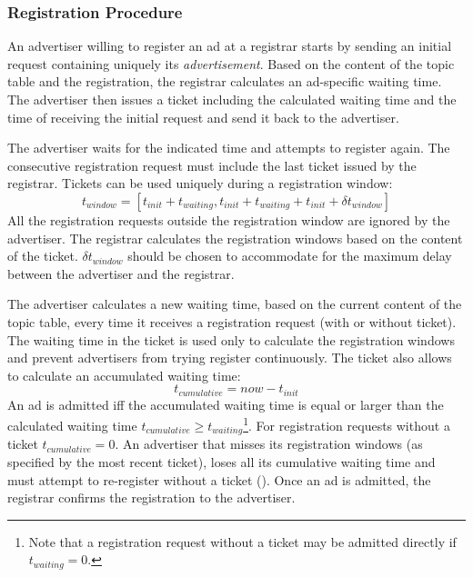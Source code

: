 \subsubsection{Registration Procedure}
An advertiser willing to register an ad at a registrar starts by sending an initial request containing uniquely its \emph{advertisement}. Based on the content of the topic table and the registration, the registrar calculates an ad-specific waiting time. The advertiser then issues a ticket including the calculated waiting time and the time of receiving the initial request and send it back to the advertiser. 

The advertiser waits for the indicated time and attempts to register again. The consecutive registration request must include the last ticket issued by the registrar. Tickets can be used uniquely during a registration window:
\begin{equation}\label{eq:registration_window}
    t_\textit{window} = [t_\textit{init} + t_\textit{waiting}, t_\textit{init} + t_\textit{waiting} + t_\textit{init} + \delta t_\textit{window}]
\end{equation}
All the registration requests outside the registration window are ignored by the advertiser. The registrar calculates the registration windows based on the content of the ticket. $\delta t_\textit{window}$ should be chosen to accommodate for the maximum delay between the advertiser and the registrar. 

The advertiser calculates a new waiting time, based on the current content of the topic table, every time it receives a registration request (with or without ticket). The waiting time in the ticket is used only to calculate the registration windows and prevent advertisers from trying register continuously. The ticket also allows to calculate an accumulated waiting time:
\begin{equation}
    t_\textit{cumulative} = \textit{now} - t_\textit{init}
\end{equation}
An ad is admitted iff the accumulated waiting time is equal or larger than the calculated waiting time $t_\textit{cumulative} \ge t_\textit{waiting}$\footnote{Note that a registration request without a ticket may be admitted directly if $t_\textit{waiting}=0$.}. For registration requests without a ticket $t_\textit{cumulative} = 0$. An advertiser that misses its registration windows (as specified by the most recent ticket), loses all its cumulative waiting time and must attempt to re-register without a ticket (). Once an ad is admitted, the registrar confirms the registration to the advertiser. 

